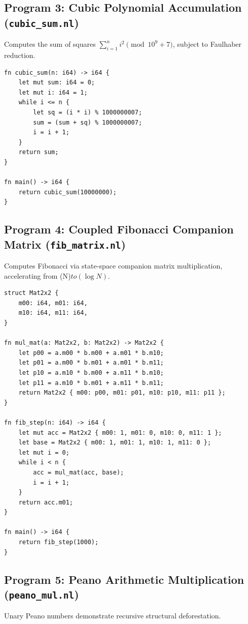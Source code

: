\subsection{Program 3: Cubic Polynomial Accumulation (\texttt{cubic\_sum.nl})}
Computes the sum of squares $\sum_{i=1}^n i^2 \pmod{10^9+7}$, subject to Faulhaber reduction.

\begin{lstlisting}[language=NumLang, caption={Cubic Polynomial Sum in NumLang.}]
fn cubic_sum(n: i64) -> i64 {
    let mut sum: i64 = 0;
    let mut i: i64 = 1;
    while i <= n {
        let sq = (i * i) % 1000000007;
        sum = (sum + sq) % 1000000007;
        i = i + 1;
    }
    return sum;
}

fn main() -> i64 {
    return cubic_sum(10000000);
}
\end{lstlisting}

\subsection{Program 4: Coupled Fibonacci Companion Matrix (\texttt{fib\_matrix.nl})}
Computes Fibonacci via state-space companion matrix multiplication, accelerating from (N)$ to (\log N)$.

\begin{lstlisting}[language=NumLang, caption={Coupled Fibonacci Companion Matrix Loop.}]
struct Mat2x2 {
    m00: i64, m01: i64,
    m10: i64, m11: i64,
}

fn mul_mat(a: Mat2x2, b: Mat2x2) -> Mat2x2 {
    let p00 = a.m00 * b.m00 + a.m01 * b.m10;
    let p01 = a.m00 * b.m01 + a.m01 * b.m11;
    let p10 = a.m10 * b.m00 + a.m11 * b.m10;
    let p11 = a.m10 * b.m01 + a.m11 * b.m11;
    return Mat2x2 { m00: p00, m01: p01, m10: p10, m11: p11 };
}

fn fib_step(n: i64) -> i64 {
    let mut acc = Mat2x2 { m00: 1, m01: 0, m10: 0, m11: 1 };
    let base = Mat2x2 { m00: 1, m01: 1, m10: 1, m11: 0 };
    let mut i = 0;
    while i < n {
        acc = mul_mat(acc, base);
        i = i + 1;
    }
    return acc.m01;
}

fn main() -> i64 {
    return fib_step(1000);
}
\end{lstlisting}

\subsection{Program 5: Peano Arithmetic Multiplication (\texttt{peano\_mul.nl})}
Unary Peano numbers demonstrate recursive structural deforestation.

